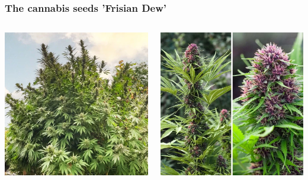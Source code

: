\documentclass[
    12pt,
    aspectratio=1610,
    b,
    bibliography=../bibliography.bib,
    link-citations]{beamer}
\begin{document}
    \begin{frame}
        \frametitle{The cannabis seeds 'Frisian Dew'}
        \begin{columns}[T]
            \begin{column}{.45\textwidth}
                \includegraphics[width=\linewidth]{DUTCH-PASSION_Frisian-Dew_1}
            \end{column}
            \begin{column}{.45\textwidth}
                \includegraphics[width=\linewidth]{DUTCH-PASSION_Frisian-Dew_2}
            \end{column}
        \end{columns}
    \end{frame}
\end{document}
